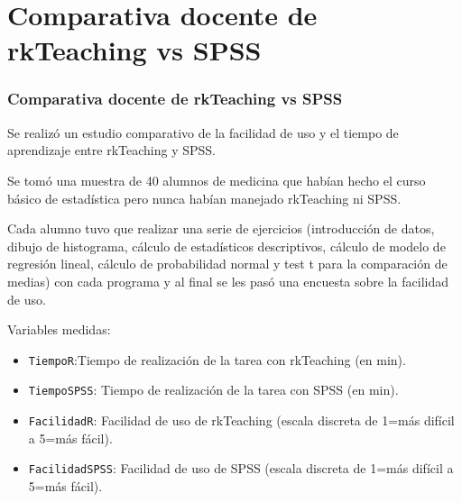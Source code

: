 \documentclass[mathserif,profesionalfont,10pt,dvips,xcolor=table]{beamer}
\theoremstyle{definition}
\begin{document}
\section{Comparativa docente de rkTeaching vs SPSS}
\begin{frame}
\frametitle{Comparativa docente de rkTeaching vs SPSS }
Se realizó un estudio comparativo de la facilidad de uso y el tiempo de aprendizaje entre rkTeaching y SPSS.

Se tomó una muestra de 40 alumnos de medicina que habían hecho el curso básico de estadística pero nunca habían manejado rkTeaching ni SPSS.

Cada alumno tuvo que realizar una serie de ejercicios (introducción de datos, dibujo de histograma, cálculo de estadísticos descriptivos, cálculo de modelo de regresión lineal, cálculo de probabilidad normal y test t para la comparación de medias) con cada programa y al final se les pasó una encuesta sobre la facilidad de uso.

Variables medidas:
\begin{itemize}
\item \texttt{TiempoR}:Tiempo de realización de la tarea con rkTeaching (en min).
\item \texttt{TiempoSPSS}: Tiempo de realización de la tarea con SPSS (en min).
\item \texttt{FacilidadR}: Facilidad de uso de rkTeaching (escala discreta de 1=más difícil a 5=más fácil).
\item \texttt{FacilidadSPSS}: Facilidad de uso de SPSS (escala discreta de 1=más difícil a 5=más fácil).
\end{itemize} 
\end{frame}


\end{document}
